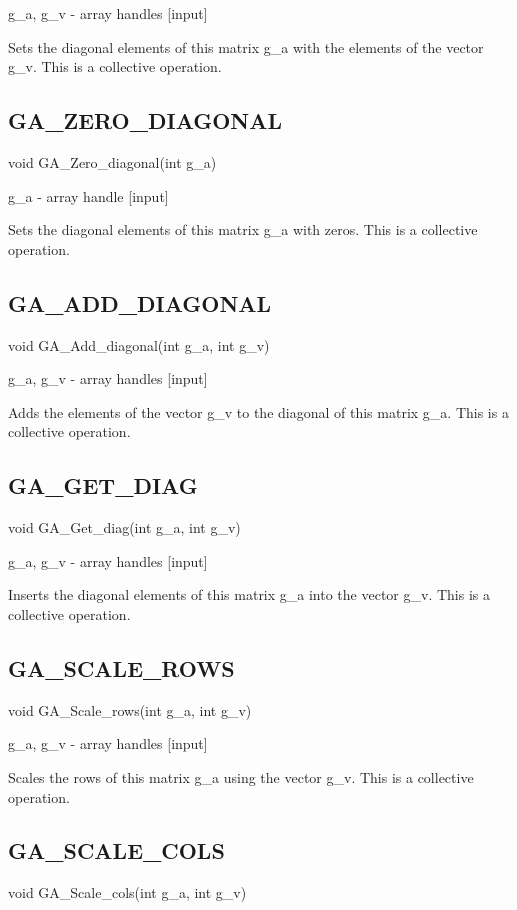 g\_a, g\_v - array handles {[}input{]}

Sets the diagonal elements of this matrix g\_a with the elements of
the vector g\_v. This is a collective operation. 


\subsection*{GA\_ZERO\_DIAGONAL}

void GA\_Zero\_diagonal(int g\_a)

g\_a - array handle {[}input{]}

Sets the diagonal elements of this matrix g\_a with zeros. This is
a collective operation. 


\subsection*{GA\_ADD\_DIAGONAL}

void GA\_Add\_diagonal(int g\_a, int g\_v)

g\_a, g\_v - array handles {[}input{]}

Adds the elements of the vector g\_v to the diagonal of this matrix
g\_a. This is a collective operation. 


\subsection*{GA\_GET\_DIAG}

void GA\_Get\_diag(int g\_a, int g\_v)

g\_a, g\_v - array handles {[}input{]}

Inserts the diagonal elements of this matrix g\_a into the vector
g\_v. This is a collective operation.


\subsection*{GA\_SCALE\_ROWS}

void GA\_Scale\_rows(int g\_a, int g\_v)

g\_a, g\_v - array handles {[}input{]}

Scales the rows of this matrix g\_a using the vector g\_v. This is
a collective operation. 


\subsection*{GA\_SCALE\_COLS}

void GA\_Scale\_cols(int g\_a, int g\_v)

